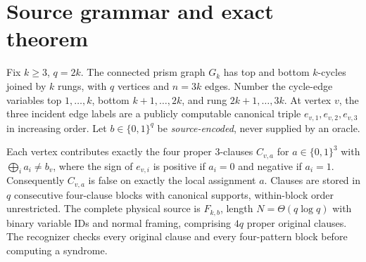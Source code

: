 \documentclass[11pt]{article}
\begin{document}
\section{Source grammar and exact theorem}
Fix $k\ge3$, $q=2k$. The connected prism graph $G_k$ has top and bottom $k$-cycles joined by $k$ rungs, with $q$ vertices and $n=3k$ edges. Number the cycle-edge variables top $1,\ldots,k$, bottom $k+1,\ldots,2k$, and rung $2k+1,\ldots,3k$. At vertex $v$, the three incident edge labels are a publicly computable canonical triple $e_{v,1},e_{v,2},e_{v,3}$ in increasing order. Let $b\in\{0,1\}^q$ be \emph{source-encoded}, never supplied by an oracle.

Each vertex contributes exactly the four proper 3-clauses $C_{v,a}$ for $a\in\{0,1\}^3$ with $\bigoplus_i a_i\ne b_v$, where the sign of $e_{v,i}$ is positive if $a_i=0$ and negative if $a_i=1$. Consequently $C_{v,a}$ is false on exactly the local assignment $a$. Clauses are stored in $q$ consecutive four-clause blocks with canonical supports, within-block order unrestricted. The complete physical source is $F_{k,b}$, length $N=\Theta(q\log q)$ with binary variable IDs and normal framing, comprising $4q$ proper original clauses. The recognizer checks every original clause and every four-pattern block before computing a syndrome.
\end{document}
